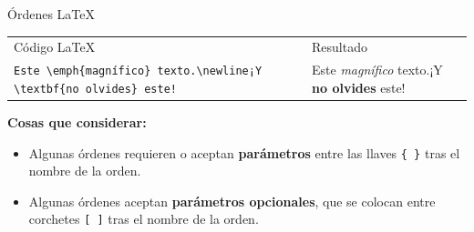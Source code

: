 \documentclass[10pt, xcolor=table]{beamer}
\begin{document}
\begin{frame}{Órdenes \LaTeX{}}
	\begin{table}[H]
		\begin{tabular}{ L{4cm} L{0.5cm} L{4cm} }
			\alert{Código \LaTeX{}}                                                                                                                                               & \hspace{1cm} & \alert{Resultado}                                                                              \\
			\texttt{Este \textbackslash emph\{magnífico\} texto.\textbackslash newline}\newline\texttt{¡Y \textbackslash textbf\{no olvides\} este!} &              & Este \emph{magnífico} texto.\newline¡Y \textbf{no olvides} este! \\
		\end{tabular}
	\end{table}
	
	\textbf{Cosas que considerar:}
	\begin{itemize}
		\item Algunas órdenes requieren o aceptan \textbf{parámetros} entre las llaves \texttt{\{ \}} tras el nombre de la orden.
		\item Algunas órdenes aceptan \textbf{parámetros opcionales}, que se colocan entre corchetes \texttt{[ ]} tras el nombre de la orden.
	\end{itemize}
\end{frame}
\end{document}

